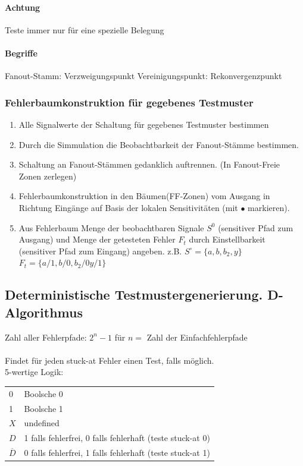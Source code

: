\documentclass[6pt,a4paper]{scrartcl}
\begin{document}
\begin{multicols}{3}
	\paragraph{Achtung} Teste immer nur für eine spezielle Belegung 
	\paragraph{Begriffe} 
	Fanout-Stamm: Verzweigungspunkt \quad
	Vereinigungspunkt: Rekonvergenzpunkt \\
	
	
	\subsubsection{Fehlerbaumkonstruktion für gegebenes Testmuster}
	\begin{enumerate}
	\item Alle Signalwerte der Schaltung für gegebenes Testmuster bestimmen
	\item Durch die Simmulation die Beobachtbarkeit der Fanout-Stämme bestimmen.
	\item Schaltung an Fanout-Stämmen gedanklich auftrennen. (In Fanout-Freie Zonen zerlegen)
	\item Fehlerbaumkonstruktion in den Bäumen(FF-Zonen) vom Ausgang in Richtung Eingänge auf Basis der lokalen Sensitivitäten (mit $\bullet$ markieren).
	\item Aus Fehlerbaum Menge der beobachtbaren Signale $S^0$ (sensitiver Pfad zum Ausgang) und Menge der getesteten Fehler $F_t$ durch Einstellbarkeit (sensitiver Pfad zum Eingang) angeben.
	z.B. $S^\circ =\{ a, b, b_2, y \}$ \quad $F_t = \{ a/1 , b / 0 , b_2/0 y / 1 \}$\\
	\end{enumerate}


	

	\subsection{Deterministische Testmustergenerierung. D-Algorithmus}
	Zahl aller Fehlerpfade: $2^n -1$ für $n =$ Zahl der Einfachfehlerpfade\\ \\
	Findet für jeden stuck-at Fehler einen Test, falls möglich.\\
	5-wertige Logik:\\
	\begin{tabular}{ll}
		0 & Boolsche 0 \\
		1 & Boolsche 1\\
		$X$ & undefined \\
		$D$ & 1 falls fehlerfrei, 0 falls fehlerhaft (teste stuck-at 0)\\
		$\overline D$ & 0 falls fehlerfrei, 1 falls fehlerhaft (teste stuck-at 1)\\
	\end{tabular}
	

\end{multicols}
\end{document}

